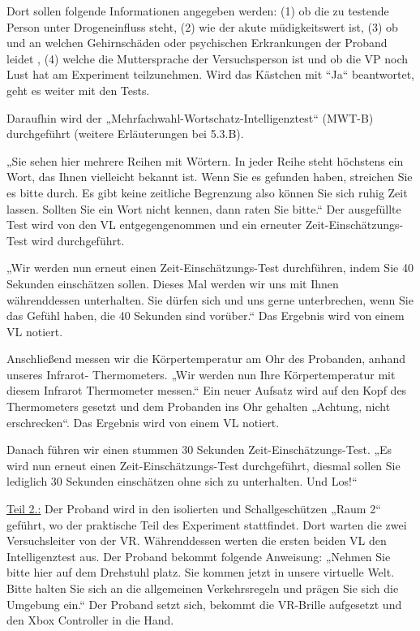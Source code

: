 \documentclass{Bericht}
\begin{document}
Dort sollen folgende Informationen angegeben werden: (1) ob die zu testende Person unter
Drogeneinfluss steht, (2) wie der akute müdigkeitswert ist, (3) ob und an welchen Gehirnschäden
oder psychischen Erkrankungen der Proband leidet , (4) welche die Muttersprache der Versuchsperson
ist und ob die VP noch Lust hat am Experiment teilzunehmen. Wird das Kästchen
mit “Ja“ beantwortet, geht es weiter mit den Tests.
\par
Daraufhin wird der „Mehrfachwahl-Wortschatz-Intelligenztest“ (MWT-B) durchgeführt (weitere
Erläuterungen bei 5.3.B).
\par
„Sie sehen hier mehrere Reihen mit Wörtern. In jeder Reihe steht höchstens ein Wort, das Ihnen
vielleicht bekannt ist. Wenn Sie es gefunden haben, streichen Sie es bitte durch.
Es gibt keine zeitliche Begrenzung also können Sie sich ruhig Zeit lassen. Sollten Sie ein Wort
nicht kennen, dann raten Sie bitte.“ Der ausgefüllte Test wird von den VL entgegengenommen
und ein erneuter Zeit-Einschätzungs-Test wird durchgeführt.
\par
„Wir werden nun erneut einen Zeit-Einschätzungs-Test durchführen, indem Sie 40 Sekunden
einschätzen sollen. Dieses Mal werden wir uns mit Ihnen währenddessen unterhalten. Sie dürfen
sich und uns gerne unterbrechen, wenn Sie das Gefühl haben, die 40 Sekunden sind vorüber.“
Das Ergebnis wird von einem VL notiert.
\par
Anschließend messen wir die Körpertemperatur am Ohr des Probanden, anhand unseres Infrarot-
Thermometers. „Wir werden nun Ihre Körpertemperatur mit diesem Infrarot Thermometer
messen.“ Ein neuer Aufsatz wird auf den Kopf des Thermometers gesetzt und dem Probanden
ins Ohr gehalten „Achtung, nicht erschrecken“. Das Ergebnis wird von einem VL notiert.
\par
Danach führen wir einen stummen 30 Sekunden Zeit-Einschätzungs-Test. „Es wird nun erneut
einen Zeit-Einschätzungs-Test durchgeführt, diesmal sollen Sie lediglich 30 Sekunden einschätzen
ohne sich zu unterhalten. Und Los!“
\par
\underline{Teil 2.:}
Der Proband wird in den isolierten und Schallgeschützen „Raum 2“ geführt, wo der praktische
Teil des Experiment stattfindet. Dort warten die zwei Versuchsleiter von der VR. Währenddessen
werten die ersten beiden VL den Intelligenztest aus.
Der Proband bekommt folgende Anweisung: „Nehmen Sie bitte hier auf dem Drehstuhl platz.
Sie kommen jetzt in unsere virtuelle Welt. Bitte halten Sie sich an die allgemeinen Verkehrsregeln
und prägen Sie sich die Umgebung ein.“
Der Proband setzt sich, bekommt die VR-Brille aufgesetzt und den Xbox Controller in die Hand.
\end{document}
